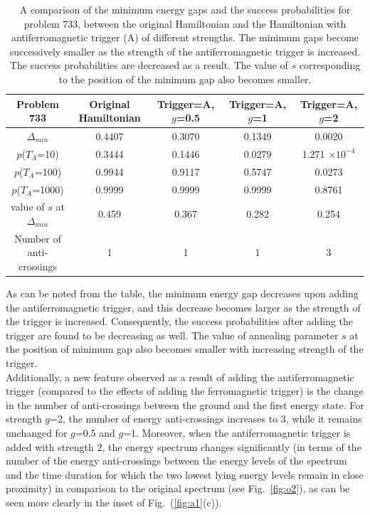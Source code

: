 \documentclass[../main.tex]{subfiles}
\begin{document}
\begin{table}[H]
\centering
\renewcommand{\arraystretch}{1.5}
\begin{tabular}{|c|c|c|c|c|}
\hline 
Problem 733 & Original Hamiltonian & Trigger=A, $g$=0.5 & Trigger=A, $g$=1 & Trigger=A, $g$=2 \\ 
\hline 
$\Delta_{min}$ & 0.4407 & 0.3070 & 0.1349 & 0.0020 \\ 
\hline 
$p$($T_A$=10) & 0.3444 & 0.1446 & 0.0279 & 1.271 $\times 10^{-4}$ \\ 
\hline 
$p$($T_A$=100) & 0.9944 & 0.9117 & 0.5747 & 0.0273 \\ 
\hline 
$p$($T_A$=1000) & 0.9999 & 0.9999 & 0.9999 & 0.8761 \\ 
\hline 
value of $s$ at $\Delta_{min}$ & 0.459 & 0.367 & 0.282 & 0.254 \\ 
\hline
Number of anti-crossings & 1 & 1 & 1 & 3 \\
\hline
\end{tabular} 
\caption{A comparison of the minimum energy gaps and the success probabilities for problem 733, between the original Hamiltonian and the Hamiltonian with antiferromagnetic trigger (A) of different strengths. The minimum gaps become successively smaller as the strength of the antiferromagnetic trigger is increased. The success probabilities are decreased as a result. The value of $s$ corresponding to the position of the minimum gap also becomes smaller.}
\label{tab:a1}
\end{table}
As can be noted from the table, the minimum energy gap decreases upon adding the antiferromagnetic trigger, and this decrease becomes larger as the strength of the trigger is increased. Consequently, the success probabilities after adding the trigger are found to be decreasing as well. The value of annealing parameter $s$ at the position of minimum gap also becomes smaller with increasing strength of the trigger.\\
Additionally, a new feature observed as a result of adding the antiferromagnetic trigger (compared to the effects of adding the ferromagnetic trigger) is the change in the number of anti-crossings between the ground and the first energy state. For strength $g$=2, the number of energy anti-crossings increases to 3, while it remains unchanged for $g$=0.5 and $g$=1. Moreover, when the antiferromagnetic trigger is added with strength 2, the energy spectrum changes significantly (in terms of the number of the energy anti-crossings between the energy levels of the spectrum and the time duration for which the two lowest lying energy levels remain in close proximity) in comparison to the original spectrum (see Fig.~\ref{fig:o2}), as can be seen more clearly in the inset of Fig.~(\ref{fig:a1}(c)).\\
\end{document}
